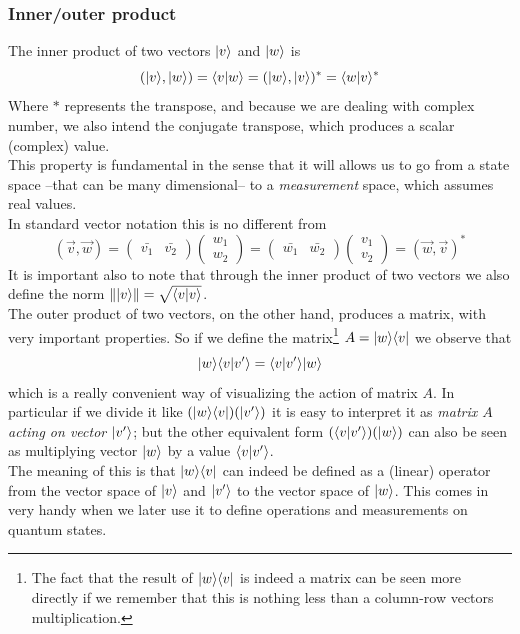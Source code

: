 	\subsubsection*{Inner/outer product}
	The inner product of two vectors $|v \rangle$ and $|w \rangle$ is
	$$ ( |v \rangle , |w \rangle ) = \langle v|w\rangle = (|w \rangle , |v \rangle )^{\ast} = \langle w|v\rangle^{\ast} $$
	Where $\ast$ represents the transpose, and because we are dealing with complex number, we also intend the conjugate transpose,	which produces a scalar (complex) value.\\ %
	This property is fundamental in the sense that it will allows us to go from a state space --that can be many dimensional-- to a \textit{measurement} space, which assumes real values.\\ %
	In standard vector notation this is no different from
	$$ ( \vec{v}, \vec{w} ) =  \begin{pmatrix} \bar{v_1} & \bar{v_2}\end{pmatrix} \begin{pmatrix} w_1 \\ w_2 \end{pmatrix} = \begin{pmatrix} \bar{w_1} & \bar{w_2}\end{pmatrix} \begin{pmatrix} v_1 \\ v_2 \end{pmatrix} = ( \vec{w}, \vec{v} )^{\ast}$$
	It is important also to note that through the inner product of two vectors we also define the norm $\Vert|v \rangle\Vert  =  \sqrt{\langle v|v\rangle} $.\\
	
	
	The outer product of two vectors, on the other hand, produces a matrix, with very important properties. So if we define the matrix\footnote{The fact that the result of  $ |w \rangle\langle v| $ is indeed a matrix can be seen more directly if we remember that this is nothing less than a column-row vectors multiplication.} $A =  |w \rangle\langle v| $ we observe that
	$$ |w \rangle\langle v|v'\rangle = \langle v|v'\rangle|w \rangle $$	
	which is a really convenient way of visualizing the action of matrix $A$. In particular if we divide it like $(|w \rangle\langle v|) (|v' \rangle) $ it is easy to interpret it as \textit{matrix $A$ acting on vector $|v' \rangle$}; but the other equivalent form $(\langle v|v'\rangle)(|w \rangle)$ can also be seen as multiplying vector $|w \rangle$ by a value $\langle v|v'\rangle$. \\
	The meaning of this is that $|w \rangle\langle v|$ can indeed be defined as a (linear) operator from the vector space of $|v \rangle$ and $|v' \rangle$ to the vector space of $|w \rangle$. This comes in very handy when we later use it to define operations and measurements on quantum states. %
	

